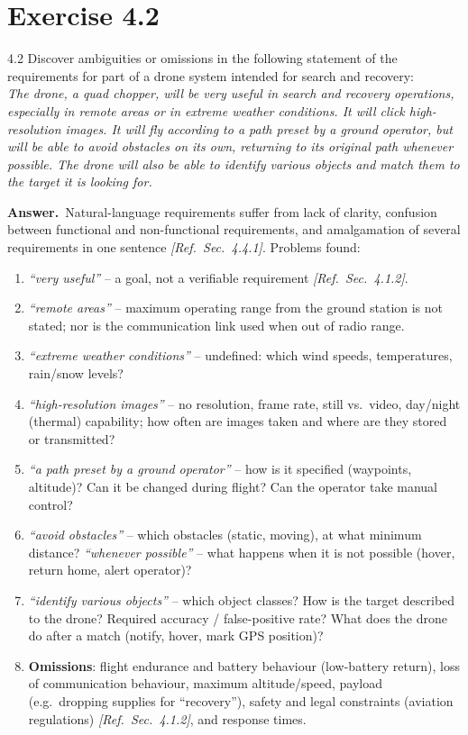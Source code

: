 \documentclass[11pt,a4paper]{article}
\newcommand{\answer}{\par\noindent\textbf{Answer.}\ }
\newcommand{\refsec}[1]{\hfill\textit{\small[Ref.\ Sec.~#1]}}
\begin{document}
\section*{Exercise 4.2}
\begin{question}{4.2}
Discover ambiguities or omissions in the following statement of the requirements for part of a drone
system intended for search and recovery:\\[2pt]
\textit{The drone, a quad chopper, will be very useful in search and recovery operations, especially in
remote areas or in extreme weather conditions. It will click high-resolution images. It will fly according
to a path preset by a ground operator, but will be able to avoid obstacles on its own, returning to its
original path whenever possible. The drone will also be able to identify various objects and match them
to the target it is looking for.}
\end{question}
\answer Natural-language requirements suffer from lack of clarity, confusion between functional and
non-functional requirements, and amalgamation of several requirements in one sentence
\refsec{4.4.1}. Problems found:
\begin{enumerate}[leftmargin=*]
  \item \emph{``very useful''} -- a goal, not a verifiable requirement \refsec{4.1.2}.
  \item \emph{``remote areas''} -- maximum operating range from the ground station is not stated; nor is
  the communication link used when out of radio range.
  \item \emph{``extreme weather conditions''} -- undefined: which wind speeds, temperatures, rain/snow levels?
  \item \emph{``high-resolution images''} -- no resolution, frame rate, still vs.\ video, day/night (thermal)
  capability; how often are images taken and where are they stored or transmitted?
  \item \emph{``a path preset by a ground operator''} -- how is it specified (waypoints, altitude)? Can it
  be changed during flight? Can the operator take manual control?
  \item \emph{``avoid obstacles''} -- which obstacles (static, moving), at what minimum distance?
  \emph{``whenever possible''} -- what happens when it is not possible (hover, return home, alert operator)?
  \item \emph{``identify various objects''} -- which object classes? How is the target described to the
  drone? Required accuracy / false-positive rate? What does the drone do after a match (notify, hover,
  mark GPS position)?
  \item \textbf{Omissions}: flight endurance and battery behaviour (low-battery return), loss of
  communication behaviour, maximum altitude/speed, payload (e.g.\ dropping supplies for ``recovery''),
  safety and legal constraints (aviation regulations) \refsec{4.1.2}, and response times.
\end{enumerate}
\end{document}
